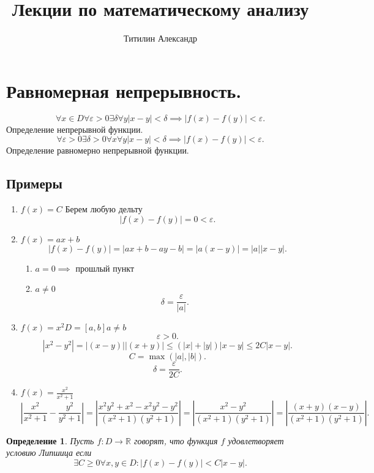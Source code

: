 \documentclass{scrartcl}
\title{Лекции по математическому анализу}
\author{Титилин Александр}
\date{}
\newtheorem{definition}{Определение}
\begin{document}
    \maketitle
    \section{Равномерная непрерывность.}
    \[
    \forall x \in D \forall  \varepsilon > 0 \exists  \delta \forall y |x - y| < \delta\implies |f(x) -f(y)| < \varepsilon
    .\] 
    Определение непрерывной функции.
    \[
    \forall  \varepsilon > 0 \exists  \delta >0 \forall x \forall y |x- y| < \delta \implies |f(x) - f(y)| < \varepsilon
    .\] 
    Определение равномерно непрерывной функции.
    \subsection{Примеры}
    \begin{enumerate}
        \item $f(x) =  C$
            Берем любую дельту
             \[
                 |f(x) - f(y)| = 0 < \varepsilon
            .\] 
        \item $f(x) = ax + b$
            \[
            |f(x) - f(y)| = |ax + b - ay -b| =|a(x - y)| = |a||x - y|
            .\] 
            \begin{enumerate}
                \item $a = 0 \implies$ прошлый пункт
                \item $a \neq 0$ 
                    \[
                    \delta = \frac{\varepsilon}{|a|}
                    .\] 
            \end{enumerate}
        \item $f(x) =  x^2 D = [a,b] a\neq b$
            \[
            \varepsilon > 0
            .\] 
            \[
            |x^2 - y^2| = |(x - y)||(x + y)| \le  (|x| + |y|)|x - y| \le  2C|x - y|
            .\] 
            \[
            C = \max(|a| , |b|)
            .\] 
            \[
            \delta = \frac{\varepsilon}{2C}
            .\] 
        \item $f(x) = \frac{x^2}{x^2 + 1}$
            \[
            | \frac{x^2}{x^2 + 1} - \frac{y^2}{y^2 + 1} | =
            |\frac{x^2y^2 + x^2 - x^2y^2 - y^2}{(x^2 + 1)(y^2 + 1)}| =
            |\frac{x^2 - y^2}{(x^2 + 1)(y^2 + 1)}| =
            |\frac{(x + y)(x - y)}{(x^2 + 1)(y^2 + 1)}|
            .\] 
    \end{enumerate}
    \begin{definition}
        Пусть $f: D \to \mathbb{R}$ говорят, что функция $f$ удовлетворяет условию Липшица
     если 
      \[
     \exists  C \ge  0 \forall  x, y \in D : |f(x) - f(y)| < C|x - y|
     .\] 
    \end{definition}
\end{document}
